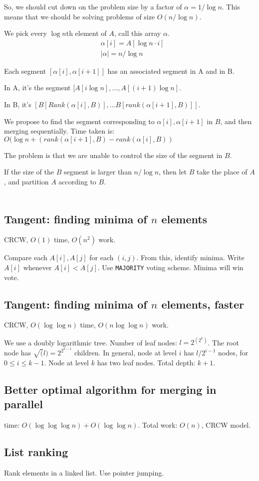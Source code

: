 So, we should cut down on the problem size by a factor of $\alpha = 1/\log n$.
This means that we should be solving problems of size $O(n / \log n)$.


We pick every $\log n$th element of $A$, call this array $\alpha$.  
\begin{align*}
&\alpha[i] = A[\log n \cdot i] \\
&|\alpha| = n / \log n
\end{align*}

Each segment $[\alpha[i], \alpha[i+1]]$ has an associated segment in A and in B. 

In A, it's the segment $[A[i \log n], \dots, A[(i + 1) \log n]$.

In B, it's $[B[Rank(\alpha[i], B)], \dots B[rank(\alpha[i+1], B)]]$.

We propose to find the segment corresponding to $\alpha[i], \alpha[i+1]$ in $B$,
and then merging sequentially. Time taken is: $O(\log n + (rank(\alpha[i+1], B) - rank(\alpha[i], B))$

The problem is that we are unable to control the size of the segment in $B$.

If the size of the $B$ segment is larger than $n / \log n$, then let $B$
take the place of $A$, and partition $A$ according to $B$.


\begin{align*}
\end{align*}

\subsection{Tangent: finding minima of $n$ elements}
CRCW, $O(1)$ time, $O(n^2)$ work.

Compare each $A[i], A[j]$ for each $(i, j)$. From this, identify minima.
Write $A[i]$ whenever $A[i] < A[j]$. Use \texttt{MAJORITY} voting scheme.
Minima will win vote.


\subsection{Tangent: finding minima of $n$ elements, faster}
CRCW, $O(\log \log n)$ time, $O(n \log \log n)$ work.

We use a doubly logarithmic tree. Number of leaf nodes: $l = 2^(2^k)$. The root node
has $\sqrt(l) = 2^{2^{k-1}}$ children. In general, node at level $i$ has $l / 2^{i - 1}$ nodes,
for $0 \leq i \leq k - 1$. Node at level $k$ has two leaf nodes. Total depth: $k + 1$.



\subsection{Better optimal algorithm for merging in parallel}
time: $O(\log \log \log n) + O(\log \log n)$. Total work: $O(n)$, CRCW model.

\subsection{List ranking}
Rank elements in a linked list.
Use pointer jumping.


